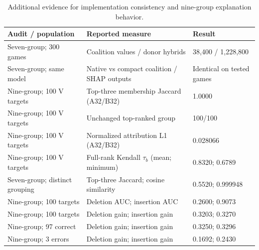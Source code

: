 \documentclass[10pt,a4paper]{article}
\begin{document}
\begin{table}[H]\centering\small\setlength{\tabcolsep}{3pt}\renewcommand{\arraystretch}{1.1}

\caption{Additional evidence for implementation consistency and nine-group explanation behavior.}\label{sup:explanation}

\begin{tabular}{L{0.3\dimexpr{}\tabcolsep\relax}L{0.46\dimexpr{}\tabcolsep\relax}L{0.24\dimexpr{}\tabcolsep\relax}}\toprule

Audit / population & Reported measure & Result\\\midrule

Seven-group; 300 games & Coalition values / donor hybrids & 38,400 / 1,228,800\\

Seven-group; same model & Native vs compact coalition / SHAP outputs & Identical on tested games\\

Nine-group; 100 V targets & Top-three membership Jaccard (A32/B32) & 1.0000\\

Nine-group; 100 V targets & Unchanged top-ranked group & 100/100\\

Nine-group; 100 V targets & Normalized attribution L1 (A32/B32) & 0.028066\\

Nine-group; 100 V targets & Full-rank Kendall \(\tau_b\) (mean; minimum) & 0.8320; 0.6789\\

Seven-group; distinct grouping & Top-three Jaccard; cosine similarity & 0.5520; 0.999948\\

Nine-group; 100 targets & Deletion AUC; insertion AUC & 0.2600; 0.9073\\

Nine-group; 100 targets & Deletion gain; insertion gain & 0.3203; 0.3270\\

Nine-group; 97 correct & Deletion gain; insertion gain & 0.3250; 0.3296\\

Nine-group; 3 errors & Deletion gain; insertion gain & 0.1692; 0.2430\\

\bottomrule\end{tabular}\end{table}
\end{document}
